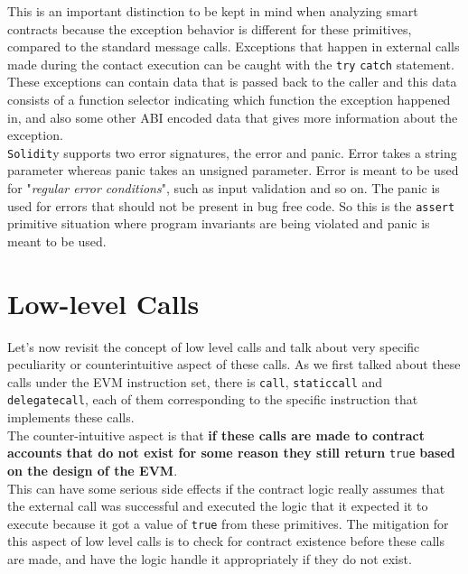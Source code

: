 This is an important distinction to be kept in mind when analyzing smart contracts because the exception behavior is different for these primitives, compared to the standard message calls. Exceptions that happen in external calls made during the contact execution can be caught with the \texttt{try} \texttt{catch} statement.\\

These exceptions can contain data that is passed back to the caller and this data consists of a function selector indicating which function the exception happened in, and also some other ABI encoded data that gives more information about the exception.\\

\texttt{Solidit}y supports two error signatures, the error and panic. Error takes a string parameter whereas panic takes an unsigned parameter. Error is meant to be used for "\textit{regular error conditions}", such as input validation and so on. The panic is used for errors that should not be present in bug free code. So this is the \texttt{assert} primitive situation where program invariants are being violated and panic is meant to be used.

\section{Low-level Calls}
Let's now revisit the concept of low level calls and talk about very specific peculiarity or counterintuitive aspect of these calls. As we first talked about these calls under the EVM instruction set, there is \texttt{call}, \texttt{staticcall} and \texttt{delegatecall}, each of them corresponding to the specific instruction that implements these calls.\\

The counter-intuitive aspect is that \textbf{if these calls are made to contract accounts that do not exist for some reason they still return} \texttt{true} \textbf{based on the design of the EVM}.\\

This can have some serious side effects if the contract logic really assumes that the external call was successful and executed the logic that it expected it to execute because it got a value of \texttt{true} from these primitives. The mitigation for this aspect of low level calls is to check for contract existence before these calls are made, and have the logic handle it appropriately if they do not exist.\\

